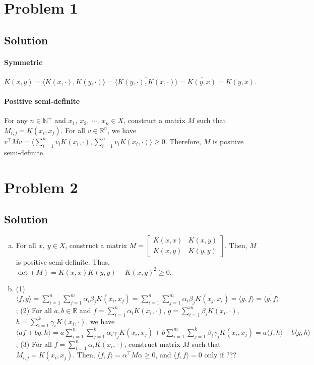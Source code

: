 \documentclass[11pt]{report}
\newcommand{\T}{\intercal}
\begin{document}

\section*{Problem 1}
\subsection*{Solution}
\paragraph{Symmetric} $K(x,y) = \langle K(x,\cdot), K(y,\cdot) \rangle = \overline{\langle K(y,\cdot), K(x,\cdot) \rangle} = \overline{K(y,x)} = K(y,x)$.
\paragraph{Positive semi-definite} For any $n \in \mathbb{N}^+$ and $x_1,\ x_2,\ \cdots,\ x_n \in X$, construct a matrix $M$ such that $M_{i,j} = K(x_i, x_j)$. For all $v \in \mathbb{R}^n$, we have $v^\T M v = \langle \sum_{i=1}^{n} v_i K(x_i, \cdot), \sum_{i=1}^{n} v_i K(x_i, \cdot) \rangle \geq 0$. Therefore, $M$ is positive semi-definite.

\section*{Problem 2}
\subsection*{Solution}
\begin{enumerate}[(a)]
  \item For all $x,\ y \in X$, construct a matrix $M = \begin{bmatrix}K(x,x) & K(x,y)\\ K(x,y) & K(y,y)\end{bmatrix}$. Then, $M$ is positive semi-definite. Thus, $\det (M) = K(x,x)K(y,y) - K(x,y)^2 \geq 0$.
  \item (1) $\langle f,g \rangle = \sum_{i=1}^{n}\sum_{j=1}^{m} \alpha_i \beta_j K(x_i, x_j) = \sum_{i=1}^{n}\sum_{j=1}^{m} \alpha_i \beta_j K(x_j, x_i) = \langle g,f \rangle = \overline{\langle g,f \rangle}$; (2) For all $a,b \in \mathbb{R}$ and $f = \sum_{i=1}^{n} \alpha_i K(x_i, \cdot)$, $g = \sum_{i=1}^{m} \beta_i K(x_i, \cdot)$, $h = \sum_{i=1}^{k} \gamma_i K(x_i, \cdot)$, we have $\langle af+bg, h \rangle = a\sum_{i=1}^{n}\sum_{j=1}^{k} \alpha_i \gamma_j K(x_i, x_j) + b\sum_{i=1}^{m}\sum_{j=1}^{k} \beta_i \gamma_j K(x_i, x_j) = a \langle f,h \rangle + b \langle g,h \rangle$; (3) For all $f = \sum_{i=1}^{n} \alpha_i K(x_i, \cdot)$, construct matrix $M$ such that $M_{i,j} = K(x_i, x_j)$. Then, $\langle f,f \rangle = \alpha^\T M \alpha \geq 0$, and $\langle f,f \rangle = 0$ only if ???
\end{enumerate}
\end{document}
